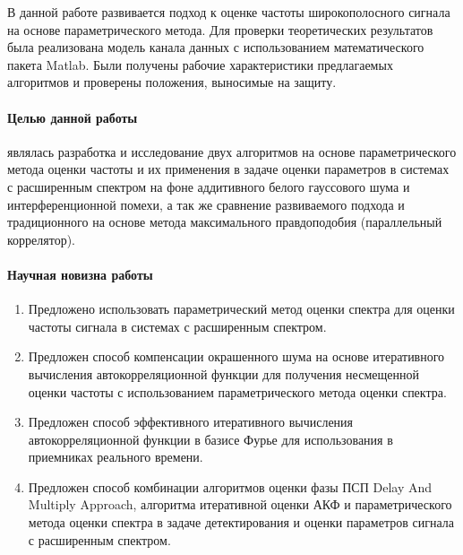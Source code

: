 В данной работе развивается подход к оценке частоты широкополосного сигнала на основе параметрического метода. Для проверки
теоретических результатов была реализована модель канала данных с использованием математического пакета Matlab. Были получены
рабочие характеристики предлагаемых алгоритмов и проверены положения, выносимые на защиту.

\paragraph{Целью данной работы} являлась разработка и исследование двух алгоритмов на основе параметрического метода оценки частоты 
и их применения в задаче оценки параметров в системах с расширенным спектром на фоне аддитивного белого гауссового шума и интерференционной помехи,
а так же сравнение развиваемого подхода и традиционного на основе метода максимального правдоподобия (параллельный коррелятор).

\paragraph{Научная новизна работы}
\begin{enumerate}
	\item{Предложено использовать параметрический метод оценки спектра для оценки частоты сигнала в системах с расширенным спектром.}
	\item{Предложен способ компенсации окрашенного шума на основе итеративного вычисления автокорреляционной функции для
		получения несмещенной оценки частоты с использованием параметрического метода оценки спектра.}
	\item{Предложен способ эффективного итеративного вычисления автокорреляционной функции в базисе Фурье для использования в
		приемниках реального времени.}
	\item{Предложен способ комбинации алгоритмов оценки фазы ПСП Delay And Multiply Approach, алгоритма итеративной оценки АКФ и
		параметрического метода оценки спектра в задаче детектирования и оценки параметров сигнала с расширенным спектром.}
\end{enumerate}

